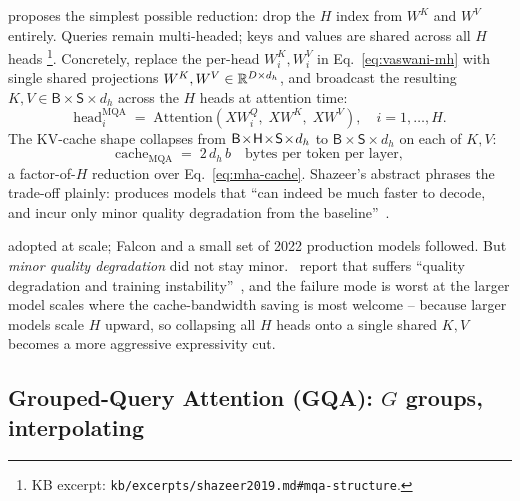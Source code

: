 \citet{shazeer2019} proposes the simplest possible reduction: drop the
$H$ index from $W^K$ and $W^V$ entirely. Queries remain multi-headed;
keys and values are shared across all $H$  heads%
\footnote{KB excerpt:
\texttt{kb/excerpts/shazeer2019.md\#mqa-structure}.}.
Concretely, replace the per-head $W_i^K, W_i^V$ in Eq.~\eqref{eq:vaswani-mh}
with single shared projections $W^K, W^V \in \mathbb{R}^{D \times d_h}$, and
broadcast the resulting $K, V \in \mathsf{B}\!\times\!\mathsf{S}\!\times\!d_h$
across the $H$  heads at attention time:
\begin{equation}
  \mathrm{head}_i^{\mathrm{MQA}}
   \;=\; \mathrm{Attention}(X W_i^Q,\; X W^K,\; X W^V),
   \quad i = 1, \ldots, H.
  \label{eq:mqa-head}
\end{equation}
The KV-cache shape collapses from $\mathsf{B}\!\times\!\mathsf{H}\!\times\!\mathsf{S}\!\times\!d_h$ to
$\mathsf{B}\!\times\!\mathsf{S}\!\times\!d_h$ on each of $K, V$:
\begin{equation}
  \mathrm{cache}_{\mathrm{MQA}}
  \;=\; 2\,d_h\,b
  \quad\text{bytes per token per layer},
  \label{eq:mqa-cache}
\end{equation}
a factor-of-$H$ reduction over Eq.~\eqref{eq:mha-cache}. Shazeer's
abstract phrases the trade-off plainly:  produces models that
``can indeed be much faster to decode, and incur only minor quality
degradation from the baseline''~\citep[abstract]{shazeer2019}.

 \citep{chowdhery2022} adopted  at scale; Falcon and a small
set of 2022 production  models followed. But \emph{minor
quality degradation} did not stay minor.~\citet{ainslie2023} report
that  suffers ``quality degradation and training
instability''~\citep[\S 1]{ainslie2023}, and the failure mode is
worst at the larger model scales where the cache-bandwidth saving is
most welcome -- because larger models scale $H$ upward, so collapsing
all $H$ heads onto a single shared $K, V$ becomes a more aggressive
expressivity cut.

\subsection{Grouped-Query Attention (GQA): $G$ groups, interpolating}
\label{sec:attn-gqa}

